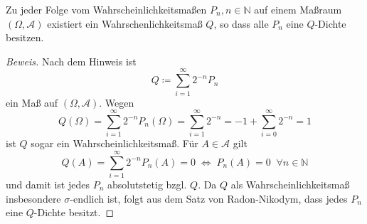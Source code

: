 \documentclass[10pt]{article}
\newenvironment{Aufgabe}[2][Aufgabe]{\begin{trivlist}
\item[\hskip \labelsep {\bfseries #1}\hskip \labelsep {\bfseries #2.}]}{\end{trivlist}}
\begin{document}
\begin{Aufgabe}{4} %
Zu jeder Folge vom Wahrscheinlichkeitsmaßen $P_n, n \in \mathbb{N}$ auf einem Maßraum $(\Omega, \mathcal{A})$ existiert ein Wahrschenlichkeitsmaß $Q$, so dass alle $P_n$ eine $Q$-Dichte besitzen.
\end{Aufgabe}

\begin{proof}[Beweis]
Nach dem Hinweis ist 
$$
Q \coloneqq \sum_{i=1}^\infty 2^{-n} P_n
$$
ein Maß auf $(\Omega, \mathcal{A})$. Wegen 
$$
Q(\Omega) = \sum_{i=1}^\infty 2^{-n} P_n(\Omega) = \sum_{i=1}^\infty 2^{-n} = -1 + \sum_{i=0}^\infty 2^{-n} = 1
$$
ist $Q$ sogar ein Wahrscheinlichkeitsmaß. Für $A \in \mathcal{A}$ gilt
$$
Q(A) = \sum_{i=1}^\infty 2^{-n} P_n(A) = 0 \; \Longleftrightarrow \; P_n(A) = 0 \;\; \forall n \in \mathbb{N}
$$
und damit ist jedes $P_n$ absolutstetig bzgl. $Q$. Da $Q$ als Wahrscheinlichkeitsmaß insbesondere $\sigma$-endlich ist, folgt aus dem Satz von Radon-Nikodym, dass jedes $P_n$ eine $Q$-Dichte besitzt.
\end{proof}
\end{document}
